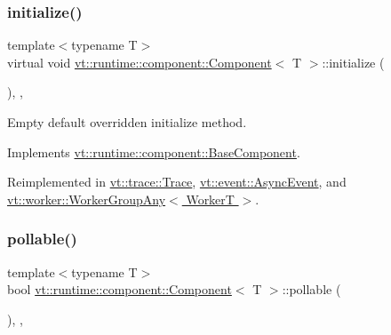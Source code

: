 \subsubsection{\texorpdfstring{initialize()}{initialize()}}
{\footnotesize\ttfamily template$<$typename T$>$ \\
virtual void \hyperlink{structvt_1_1runtime_1_1component_1_1_component}{vt\+::runtime\+::component\+::\+Component}$<$ T $>$\+::initialize (\begin{DoxyParamCaption}{ }\end{DoxyParamCaption})\hspace{0.3cm}{\ttfamily [inline]}, {\ttfamily [override]}, {\ttfamily [virtual]}}



Empty default overridden initialize method. 



Implements \hyperlink{structvt_1_1runtime_1_1component_1_1_base_component_ae361291ee8a37325580e59fb4030bc3a}{vt\+::runtime\+::component\+::\+Base\+Component}.



Reimplemented in \hyperlink{structvt_1_1trace_1_1_trace_a24019edd964c0a307008f8d6a0f1f825}{vt\+::trace\+::\+Trace}, \hyperlink{structvt_1_1event_1_1_async_event_ac8d9f977b1cca3f43a06d0e83bc88e3d}{vt\+::event\+::\+Async\+Event}, and \hyperlink{structvt_1_1worker_1_1_worker_group_any_ad8bb855b98bf26337ca13df2bff5fb95}{vt\+::worker\+::\+Worker\+Group\+Any$<$ Worker\+T $>$}.

\mbox{\label{structvt_1_1runtime_1_1component_1_1_component_a5a15bd0369a9d3765a6c70249bada96f}} 
\subsubsection{\texorpdfstring{pollable()}{pollable()}}
{\footnotesize\ttfamily template$<$typename T$>$ \\
bool \hyperlink{structvt_1_1runtime_1_1component_1_1_component}{vt\+::runtime\+::component\+::\+Component}$<$ T $>$\+::pollable (\begin{DoxyParamCaption}{ }\end{DoxyParamCaption})\hspace{0.3cm}{\ttfamily [inline]}, {\ttfamily [override]}, {\ttfamily [virtual]}}



